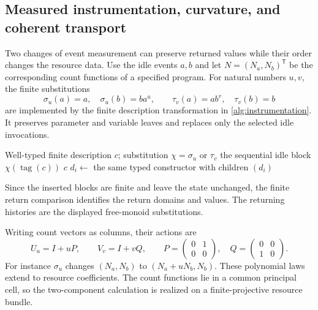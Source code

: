 \documentclass[11pt,a4paper]{article}
\numberwithin{algorithm}{section}
\numberwithin{equation}{section}
\theoremstyle{definition}
\theoremstyle{remark}
\theoremstyle{plain}
\theoremstyle{definition}
\theoremstyle{plain}
\begin{document}
\subsection{Measured instrumentation, curvature, and coherent transport}
\label{sec:instrumentation-transport}
Two changes of event measurement can preserve returned values while
their order changes the resource data. Use the idle events $a,b$ and
let $N=(N_a,N_b)^{\mathsf T}$ be the corresponding count functions of
a specified program. For natural numbers $u,v$, the finite substitutions
\[
 \sigma_u(a)=a,\quad \sigma_u(b)=ba^u,
 \qquad \tau_v(a)=ab^v,\quad\tau_v(b)=b
\]
are implemented by the finite description transformation in
\cref{alg:instrumentation}. It preserves parameter and variable leaves
and replaces only the selected idle invocations.
\begin{algorithm}[H]
\caption{Instrumentation by finite description substitution}\label{alg:instrumentation}
\small
\begin{algorithmic}[1]
\Require Well-typed finite description $c$; substitution $\chi=\sigma_u$ or $\tau_v$
    \State \Return the sequential idle block $\chi(\operatorname{tag}(c))$
    \State \Return $c$
  \Else
      \State $d_i\gets{}$ 
    \EndFor
    \State \Return the same typed constructor with children $(d_i)$
  \EndIf
\EndProcedure
\end{algorithmic}
\end{algorithm}
Since the
inserted blocks are finite and leave the state unchanged, the finite
return comparison identifies the return domains and values. The
returning histories are the displayed free-monoid substitutions.

Writing count vectors as columns, their actions are
\[
 U_u=I+uP,\qquad V_v=I+vQ,\qquad
 P=\begin{pmatrix}0&1\\0&0\end{pmatrix},\quad
 Q=\begin{pmatrix}0&0\\1&0\end{pmatrix}.
\]
For instance $\sigma_u$ changes $(N_a,N_b)$ to
$(N_a+uN_b,N_b)$. These polynomial laws extend to resource coefficients.
The count functions lie in a common principal cell, so the two-component
calculation is realized on a finite-projective resource bundle.
\end{document}
